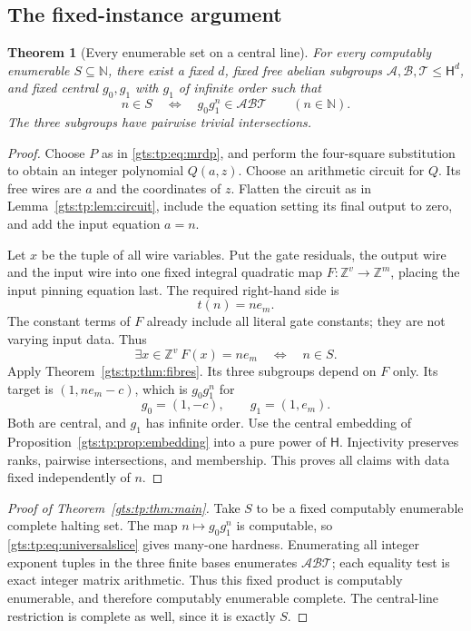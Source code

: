 \documentclass[11pt,letterpaper]{article}
\newtheorem{theorem}{Theorem}[section]
\theoremstyle{definition}
\theoremstyle{remark}
\newcommand{\ZZ}{\mathbb Z}
\newcommand{\NN}{\mathbb N}
\newcommand{\HH}{\mathsf H}
\newcommand{\calA}{\mathcal A}
\newcommand{\calB}{\mathcal B}
\newcommand{\calT}{\mathcal T}
\begin{document}
\subsection{The fixed-instance argument}
\begin{theorem}[Every enumerable set on a central line]\label{gts:tp:thm:everyset}
For every computably enumerable $S\subseteq\NN$, there exist a fixed $d$,
fixed free abelian subgroups $\calA,\calB,\calT\leq\HH^d$, and fixed central
$g_0,g_1$ with $g_1$ of infinite order such that
\begin{equation}\label{gts:tp:eq:universalslice}
            n\in S\quad\Longleftrightarrow\quad
            g_0g_1^n\in\calA\calB\calT
            \qquad(n\in\NN).
\end{equation}
The three subgroups have pairwise trivial intersections.
\end{theorem}
\begin{proof}
Choose $P$ as in \eqref{gts:tp:eq:mrdp}, and perform the four-square substitution
to obtain an integer polynomial $Q(a,z)$. Choose an arithmetic circuit for
$Q$. Its free wires are $a$ and the coordinates of $z$. Flatten the circuit
as in Lemma~\ref{gts:tp:lem:circuit}, include the equation setting its final
output to zero, and add the input equation $a=n$.

Let $x$ be the tuple of all wire variables. Put the gate residuals, the
output wire and the input wire into one fixed integral quadratic map
$F:\ZZ^v\to\ZZ^m$, placing the input pinning equation last. The required
right-hand side is
\[
                        t(n)=n e_m.
\]
The constant terms of $F$ already include all literal gate constants; they
are not varying input data. Thus
\[
            \exists x\in\ZZ^v\ F(x)=n e_m
              \quad\Longleftrightarrow\quad n\in S.
\]
Apply Theorem~\ref{gts:tp:thm:fibres}. Its three subgroups depend on $F$ only. Its
target is $(1,n e_m-c)$, which is $g_0g_1^n$ for
\[
                    g_0=(1,-c),\qquad g_1=(1,e_m).
\]
Both are central, and $g_1$ has infinite order. Use the central embedding
of Proposition~\ref{gts:tp:prop:embedding} into a pure power of $\HH$. Injectivity
preserves ranks, pairwise intersections, and membership. This proves all
claims with data fixed independently of $n$.
\end{proof}

\begin{proof}[Proof of Theorem~\ref{gts:tp:thm:main}]
Take $S$ to be a fixed computably enumerable complete halting set. The
map $n\mapsto g_0g_1^n$ is computable, so \eqref{gts:tp:eq:universalslice} gives
many-one hardness. Enumerating all integer exponent tuples in the three
finite bases enumerates $\calA\calB\calT$; each equality test is exact integer
matrix arithmetic. Thus this fixed product is computably enumerable, and
therefore computably enumerable complete. The central-line restriction is
complete as well, since it is exactly $S$.
\end{proof}
\end{document}
